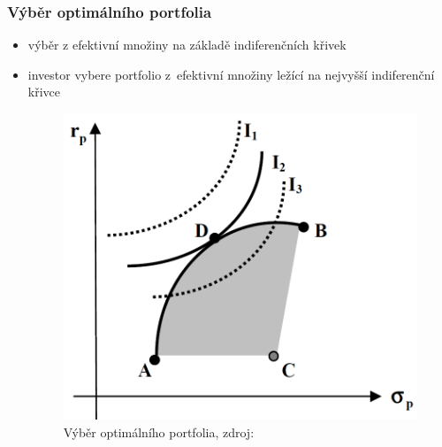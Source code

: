   

\begin{frame}
    \frametitle{Výběr optimálního portfolia}
    \begin{itemize}
      \item výběr z efektivní množiny na základě indiferenčních křivek
      \item investor vybere portfolio z~efektivní množiny ležící na nejvyšší indiferenční křivce

\begin{figure}[htb]
\centering
\includegraphics[width=.4\textwidth]{vyber.png}
\caption{Výběr optimálního portfolia, zdroj: \cite{camsky} \label{vyber}}
\end{figure}
    \end{itemize}
  \end{frame}

